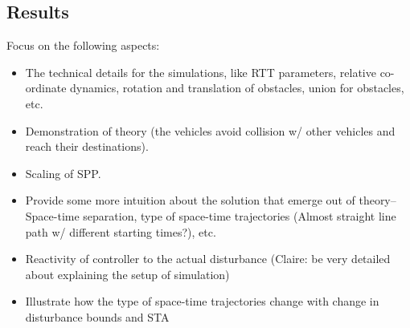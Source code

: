\subsection{Results \label{sec:city_simResults}}

Focus on the following aspects:
\begin{itemize}
\item The technical details for the simulations, like RTT parameters, relative co-ordinate dynamics, rotation and translation of obstacles, union for obstacles, etc. 
\item Demonstration of theory (the vehicles avoid collision w/ other vehicles and reach their destinations).
\item Scaling of SPP.
\item Provide some more intuition about the solution that emerge out of theory-- Space-time separation, type of space-time trajectories (Almost straight line path w/ different starting times?), etc.
\item Reactivity of controller to the actual disturbance (Claire: be very detailed about explaining the setup of simulation)
\item Illustrate how the type of space-time trajectories change with change in disturbance bounds and STA
\end{itemize}